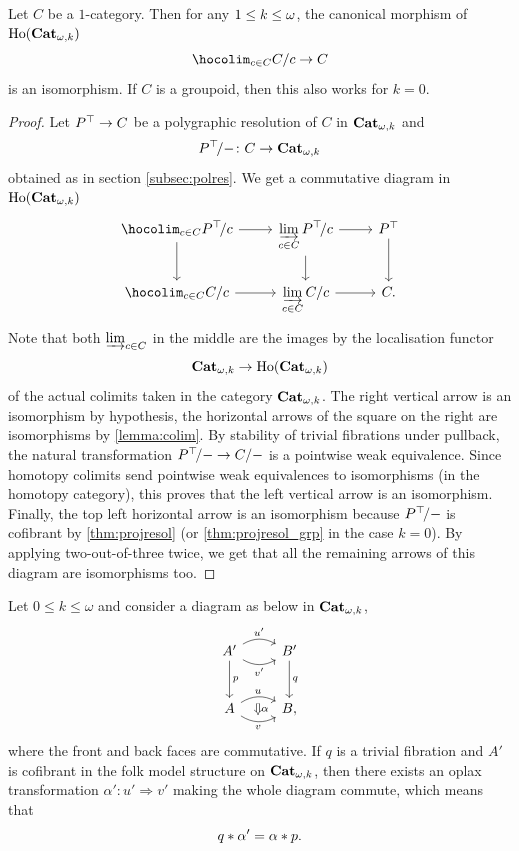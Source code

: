 \begin{proposition}\label{prop:hocolimtr}
  Let $C$ be a $1$\nbd-category. Then for any $1 \leq k \leq \omega$, the canonical morphism of
  $\mathrm{Ho}(\mathbf{Cat}_{\omega,k})$
  \[
    \hocolim_{c\in C }\tr{C}{c} \to C
    \]
  is an isomorphism. If $C$ is a groupoid, then this also works for
  $k=0$.
\end{proposition}
\begin{proof}
  Let $P^\top \to C$ be a polygraphic resolution of $C$ in
  $\mathbf{Cat}_{\omega,k}$ and \[P^\top\!/- \colon C \to \mathbf{Cat}_{\omega,k}\] obtained
  as in section \ref{subsec:polres}. We get a commutative diagram in
  $\mathrm{Ho}(\mathbf{Cat}_{\omega,k})$
  \[
    \begin{tikzcd}
      \displaystyle\hocolim_{c \in C}\tr{\frgp P\!}{c} \ar[d] \ar[r]& \displaystyle\ilim_{c \in
        C}\tr{\frgp P\!}{c} \ar[d] \ar[r] & \frgp P \ar[d] \\
      \displaystyle\hocolim_{c \in C}\tr{C}{c} \ar[r]&\displaystyle\ilim_{c \in C}\tr{C}{c}\ar[r] & C.
    \end{tikzcd}
  \]
  Note that both $\varinjlim_{c \in C}$ in the middle are the images by the
  localisation functor \[\mathbf{Cat}_{\omega,k} \to \mathrm{Ho}(\mathbf{Cat}_{\omega,k})\]
  of the actual
  colimits taken in the category $\mathbf{Cat}_{\omega,k}$. The right vertical
  arrow is an isomorphism by hypothesis, the horizontal arrows of the
  square on the right are isomorphisms by \cref{lemma:colim}. By
  stability of trivial fibrations under pullback, the natural transformation
  $P^\top\!/- \to C/-$ is a pointwise weak equivalence. Since homotopy colimits
  send pointwise weak equivalences to isomorphisms (in the homotopy
  category), this proves that the left vertical arrow is an
  isomorphism. Finally, the top left
  horizontal arrow is an isomorphism
  because $P^\top\!/-$ is cofibrant by \cref{thm:projresol} (or
  \cref{thm:projresol_grp} in the case $k=0$). By applying
  two-out-of-three twice, we get that all the remaining arrows of this diagram
  are isomorphisms too. 
\end{proof}
\begin{lemma}\label{lemma:liftoplax}
  Let $0 \leq k \leq \omega$ and consider a diagram as below in $\mathbf{Cat}_{\omega,k}$, 
  \[
    \begin{tikzcd}[row sep=large]
      A' \ar[d,"p"]\ar[r,bend left,"u'"] \ar[r,bend right,"v'"']& B' \ar[d,"q"] \\
      A \ar[r,bend left,"u",""{name=A,below}] \ar[r,bend
      right,"v"',""{name=B,above}]& B,
      \ar[from=A,to=B,Rightarrow,"\alpha"]
    \end{tikzcd}
  \]
  where the front and back faces are commutative. If $q$ is a trivial
  fibration and $A'$ is cofibrant in the folk model structure on
  $\mathbf{Cat}_{\omega,k}$, then there exists an oplax transformation $\alpha'
  \colon u' \Rightarrow v'$ making the whole diagram commute, which means
  that
  \[
    q\ast \alpha' = \alpha \ast p.
  \]
\end{lemma}

